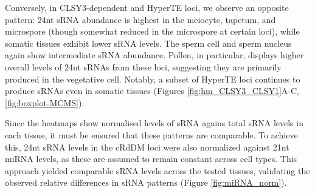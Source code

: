 Conversely, in CLSY3-dependent and HyperTE loci, we observe an opposite pattern: 24nt sRNA abundance is highest in the meiocyte, tapetum, and microspore (though somewhat reduced in the microspore at certain loci), while somatic tissues exhibit lower sRNA levels. The sperm cell and sperm nucleus again show intermediate sRNA abundance. Pollen, in particular, displays higher overall levels of 24nt sRNAs from these loci, suggesting they are primarily produced in the vegetative cell. Notably, a subset of HyperTE loci continues to produce sRNAs even in somatic tissues (Figures \ref{fig:hm_CLSY3_CLSY1}A-C, \ref{fig:boxplot-MCMS}).

Since the heatmaps show normalised levels of sRNA agains total sRNA levels in each tissue, it must be ensured that these patterns are comparable. To achieve this, 24nt sRNA levels in the cRdDM loci were also normalized against 21nt miRNA levels, as these are assumed to remain constant across cell types. This approach yielded comparable sRNA levels across the tested tissues, validating the observed relative differences in sRNA patterns (Figure \ref{fig:miRNA_norm}).

